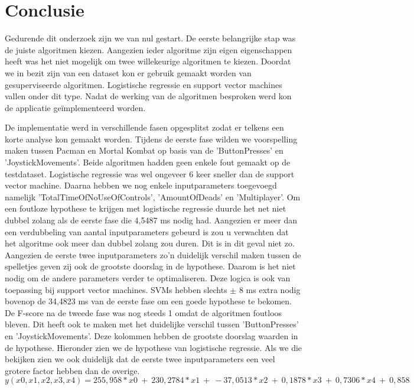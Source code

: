 
\chapter{Conclusie}
\label{ch:conclusie}



Gedurende dit onderzoek zijn we van nul gestart. De eerste belangrijke stap was de juiste algoritmen kiezen. Aangezien ieder algoritme zijn eigen eigenschappen heeft was het niet mogelijk om twee willekeurige algoritmen te kiezen. Doordat we in bezit zijn van een dataset kon er gebruik gemaakt worden van gesuperviseerde algoritmen. Logistische regressie en support vector machines vallen onder dit type. Nadat de werking van de algoritmen besproken werd kon de applicatie geïmplementeerd worden.

De implementatie werd in verschillende fasen opgesplitst zodat er telkens een korte analyse kon gemaakt worden. Tijdens de eerste fase wilden we voorspelling maken tussen Pacman en Mortal Kombat op basis van de 'ButtonPresses' en 'JoystickMovements'. Beide algoritmen hadden geen enkele fout gemaakt op de testdataset. Logistische regressie was wel ongeveer 6 keer sneller dan de support vector machine.
Daarna hebben we nog enkele inputparameters toegevoegd namelijk 'TotalTimeOfNoUseOfControls', 'AmountOfDeads' en 'Multiplayer'. Om een foutloze hypothese te krijgen met logistische regressie duurde het net niet dubbel zolang als de eerste fase die 4,5487 ms nodig had. Aangezien er meer dan een verdubbeling van aantal inputparameters gebeurd is zou u verwachten dat het algoritme ook meer dan dubbel zolang zou duren. Dit is in dit geval niet zo. Aangezien de eerste twee inputparameters zo'n duidelijk verschil maken tussen de spelletjes geven zij ook de grootste doorslag in de hypothese. Daarom is het niet nodig om de andere parameters verder te optimaliseren. Deze logica is ook van toepassing bij support vector machines. SVMs hebben slechts $\pm$ 8 ms extra nodig bovenop de 34,4823 ms van de eerste fase om een goede hypothese te bekomen. 
De F-score na de tweede fase was nog steeds 1 omdat de algoritmen foutloos bleven. Dit heeft ook te maken met het duidelijke verschil tussen 'ButtonPresses' en 'JoystickMovements'. Deze kolommen hebben de grootste doorslag waarden in de hypothese. Hieronder zien we de hypothese van logistische regressie. Als we die bekijken zien we ook duidelijk dat de eerste twee inputparameters een veel grotere factor hebben dan de overige. 
$$
y(x0, x1, x2, x3, x4) = 255,958*x0\:+\:230,2784*x1\:+\:-37,0513*x2\:+\:0,1878*x3\:+\:0,7306*x4\:+\:0,858
$$

